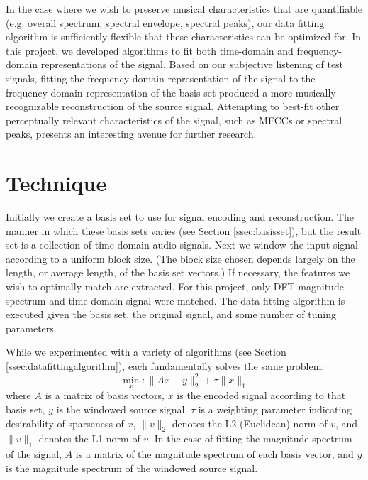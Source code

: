 \documentclass[twoside,a4paper]{article}
\begin{document}
In the case where we wish to preserve musical characteristics that are quantifiable (e.g. overall spectrum, spectral envelope, spectral peaks), our data fitting algorithm is sufficiently flexible that these characteristics can be optimized for. 
In this project, we developed algorithms to fit both time-domain and frequency-domain representations of the signal.
Based on our subjective listening of test signals, fitting the frequency-domain representation of the signal to the frequency-domain representation of the basis set produced a more musically recognizable reconstruction of the source signal. 
Attempting to best-fit other perceptually relevant characteristics of the signal, such as MFCCs or spectral peaks, presents an interesting avenue for further research. 

\section{Technique}

Initially we create a basis set to use for signal encoding and reconstruction. 
The manner in which these basis sets varies (see Section \ref{ssec:basisset}), but the result set is a collection of time-domain audio signals. 
Next we window the input signal according to a uniform block size. 
(The block size chosen depends largely on the length, or average length, of the basis set vectors.) 
If necessary, the features we wish to optimally match are extracted. 
For this project, only DFT magnitude spectrum and time domain signal were matched. 
The data fitting algorithm is executed given the basis set, the original signal, and some number of tuning parameters. 

While we experimented with a variety of algorithms (see Section \ref{ssec:datafittingalgorithm}), each fundamentally solves the same problem:
\begin{equation}
\min_{x}: \lVert Ax - y \rVert ^2_2 + \tau \lVert x \rVert _1
\end{equation}
where \(A\) is a matrix of basis vectors, \(x\) is the encoded signal according to that basis set, \(y\) is the windowed source signal, \(\tau\) is a weighting parameter indicating desirability of sparseness of \(x\), \(\lVert v \rVert _2\) denotes the L2 (Euclidean) norm of \(v\), and \(\lVert v \rVert _1\) denotes the L1 norm of \(v\). 
In the case of fitting the magnitude spectrum of the signal, \(A\) is a matrix of the magnitude spectrum of each basis vector, and \(y\) is the magnitude spectrum of the windowed source signal. 
\end{document}
